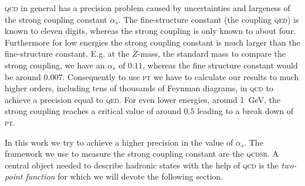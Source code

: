 \documentclass[../../index.tex]{subfiles}
\begin{document}
\textsc{qcd} in general has a precision problem caused by uncertainties and
largeness of the strong coupling constant $\alpha_s$. The fine-structure
constant (the coupling \textsc{qed}) is known to eleven digits, whereas the
strong coupling is only known to about four. Furthermore for low energies the
strong coupling constant is much larger than the fine-structure constant. E.g.
at the $Z$-mass, the standard mass to compare the strong coupling, we have an
$\alpha_s$ of $0.11$, whereas the fine structure constant would be around
$0.007$. Consequently to use \textsc{pt} we have to calculate our results to
much higher orders, including tens of thousands of Feynman diagrams, in
\textsc{qcd} to achieve a precision equal to \textsc{qed}. For even lower
energies, around \SI{1}{\giga\eV}, the strong coupling reaches a critical value
of around \(0.5\) leading to a break down of \textsc{pt}.

In this work we try to achieve a higher precision in the value of $\alpha_s$.
The framework we use to measure the strong coupling constant are the
\textsc{qcdsr}. A central object needed to describe hadronic states with the
help of \textsc{qcd} is the \textit{two-point function} for which we will devote
the following section.
\end{document}
